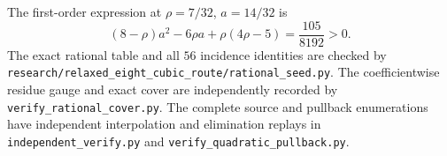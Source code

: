 The first-order expression at $\rho=7/32$, $a=14/32$ is
\[
 (8-\rho)a^2-6\rho a+\rho(4\rho-5)=\frac{105}{8192}>0.
\]
The exact rational table and all $56$ incidence identities are checked by
\nolinkurl{research/relaxed_eight_cubic_route/rational_seed.py}.
The coefficientwise residue gauge and exact cover are independently recorded by
\texttt{verify\_rational\_cover.py}. The complete source and pullback enumerations have independent interpolation and elimination replays in
\texttt{independent\_verify.py} and \texttt{verify\_quadratic\_pullback.py}.
